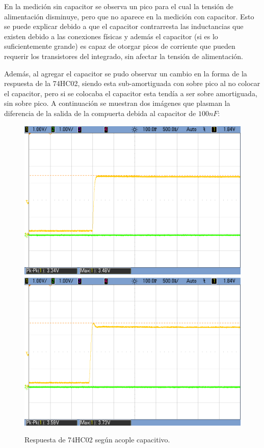 En la medición sin capacitor se observa un pico para el cual la tensión
de alimentación disminuye, pero que no aparece en la medición con
capacitor. Esto se puede explicar debido a que el capacitor contrarresta
las inductancias que existen debido a las conexiones físicas y además
el capacitor (si es lo suficientemente grande) es capaz de otorgar
picos de corriente que pueden requerir los transistores del integrado,
sin afectar la tensión de alimentación.\newline

Además, al agregar el capacitor se pudo observar un cambio en la forma
de la respuesta de la 74HC02, siendo esta sub-amortiguada con sobre
pico al no colocar el capacitor, pero si se colocaba el capacitor
esta tendía a ser sobre amortiguada, sin sobre pico. A continuación
se muestran dos imágenes que plasman la diferencia de la salida de
la compuerta debida al capacitor de $100nF$:

\begin{figure}[H]
\centering
\includegraphics[scale=0.2]{SalidaDeHConDesacople}
\qquad
\includegraphics[scale=0.2]{SalidaDeHCSinDesacople}
\caption{Respuesta de 74HC02 según acople capacitivo.}
\end{figure}
